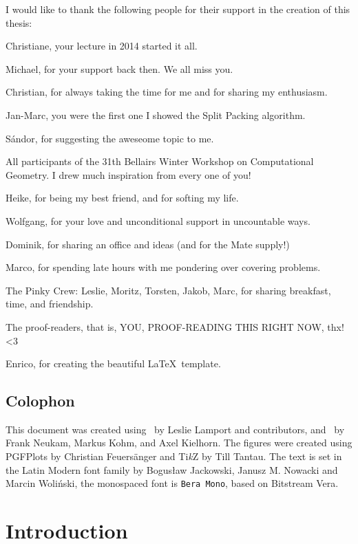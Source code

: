 \documentclass[a4paper,style=print,oneside,bibliography=totoc,nexus,lnum,extramargin]{tubsbook}
\begin{document}
I would like to thank the following people for their support in the creation of this thesis:

Christiane, your lecture in 2014 started it all.

Michael, for your support back then. We all miss you.

Christian, for always taking the time for me and for sharing my enthusiasm.

Jan-Marc, you were the first one I showed the Split Packing algorithm.

Sándor, for suggesting the aweseome topic to me.

All participants of the 31th Bellairs Winter Workshop on Computational Geometry. I drew much inspiration from every one of you!

Heike, for being my best friend, and for softing my life.

Wolfgang, for your love and unconditional support in uncountable ways.

Dominik, for sharing an office and ideas (and for the Mate supply!)

Marco, for spending late hours with me pondering over covering problems.

The Pinky Crew: Leslie, Moritz, Torsten, Jakob, Marc, for sharing breakfast, time, and friendship.

The proof-readers, that is, YOU, PROOF-READING THIS RIGHT NOW, thx! <3

Enrico, for creating the beautiful \LaTeX\ template.

\section*{Colophon}

This document was created using \LaTeXe\ by Leslie Lamport and contributors, and \KOMAScript\ by Frank Neukam, Markus Kohm, and Axel Kielhorn. The figures were created using PGFPlots by Christian Feuersänger and Ti\textit{k}Z by Till Tantau. The text is set in the Latin Modern font family by Bogusław Jackowski, Janusz M. Nowacki and Marcin Woliński, the monospaced font is \texttt{Bera Mono}, based on Bitstream Vera.

\cleardoublepage
\setcounter{tocdepth}{1}

\tableofcontents
\cleardoublepage

\mainmatter %

\chapter{Introduction}
\end{document}
